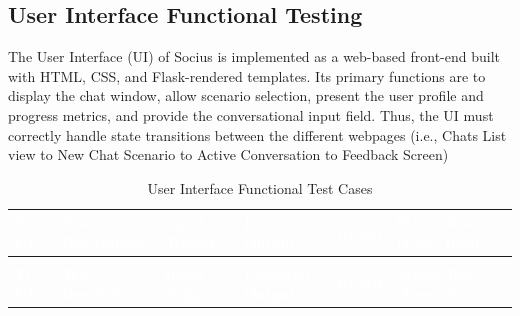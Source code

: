 \subsection{User Interface Functional Testing}
 
The User Interface (UI) of Socius is implemented as a web-based front-end built with HTML, CSS, and Flask-rendered templates. Its primary functions are to display the chat window, allow scenario selection, present the user profile and progress metrics, and provide the conversational input field. 
Thus, the UI must correctly handle state transitions between the different webpages (i.e., Chats List view to New Chat Scenario to Active Conversation to Feedback Screen)
 
\begin{longtable}{>{\bfseries}p{1.2cm} p{3.0cm} p{3.5cm} p{4.5cm} p{1.0cm} p{1.5cm}}
\caption{User Interface Functional Test Cases}
\label{tab:tc-ui} \\
 
\rowcolor{headerblue}
\textcolor{white}{\textbf{TC-UI}} &
\textcolor{white}{\textbf{Test Description}} &
\textcolor{white}{\textbf{Input / Trigger}} &
\textcolor{white}{\textbf{Expected Output}} &
\textcolor{white}{\textbf{Result}} &
\textcolor{white}{\textbf{Stress Test (Pass/Total)}} \\
\endfirsthead
 
\multicolumn{6}{c}{\tablename\ \thetable{} -- continued} \\
\rowcolor{headerblue}
\textcolor{white}{\textbf{TC-UI}} &
\textcolor{white}{\textbf{Test Description}} &
\textcolor{white}{\textbf{Input / Trigger}} &
\textcolor{white}{\textbf{Expected Output}} &
\textcolor{white}{\textbf{Result}} &
\textcolor{white}{\textbf{Stress Test (Pass/Total)}} \\
\endhead
 

\end{longtable}
